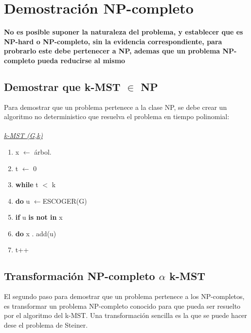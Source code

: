 \documentclass[spanish,12pt]{elsarticle}
\newcommand{\blank}[1]{\hspace*{#1}}
\begin{document}
\section{Demostración NP-completo}
\paragraph{\textnormal{No es posible suponer la naturaleza del problema, y establecer que es NP-hard o NP-completo, sin la evidencia correspondiente, para probrarlo este debe pertenecer a NP, ademas que un problema NP-completo pueda reducirse al mismo}}
\subsection{Demostrar que k-MST $\in$ NP}
Para demostrar que un problema pertenece a la clase NP, se debe crear un algoritmo no deterministico que resuelva el problema en tiempo polinomial:\\\\
\textit{\underline{k-MST (G,k)} }
\begin{enumerate}
    \item \textnormal{x $\leftarrow$ árbol.}
    \item  \textnormal{t $\leftarrow$ 0}
    \item  \textnormal{\textbf{while} t $<$ k}
    \item \textnormal{\blank{1cm}\textbf{do} u $\leftarrow${ESCOGER(G)}}
    \item  \textnormal{\blank{2cm}\textbf{if} u \textbf{is not in} x}
    \item \textnormal{\blank{3cm}\textbf{do} x . add(u)}
     \item \textnormal{\blank{3cm} t++}\\
\end{enumerate}

\subsection{Transformación NP-completo $\alpha$  k-MST}
El segundo paso para demostrar que un problema pertenece a los NP-completos, es transformar un problema NP-completo conocido para que pueda ser resuelto por el algoritmo del k-MST. Una transformación sencilla es la que se puede hacer dese el problema de Steiner.
\end{document}
